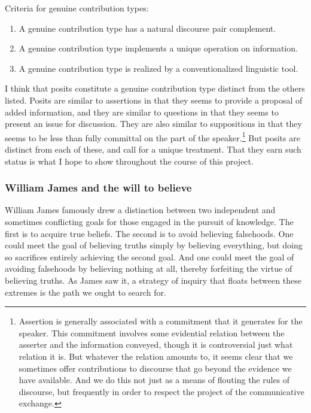 \documentclass[letterpaper,]{article}
\begin{document}
Criteria for genuine contribution types:

\begin{enumerate}
\def\labelenumi{\arabic{enumi}.}
\itemsep1pt\parskip0pt
\item
  A genuine contribution type has a natural discourse pair complement.
\item
  A genuine contribution type implements a unique operation on
  information.
\item
  A genuine contribution type is realized by a conventionalized
  linguistic tool.
\end{enumerate}

I think that posits constitute a genuine contribution type distinct from
the others listed. Posits are similar to assertions in that they seems
to provide a proposal of added information, and they are similar to
questions in that they seems to present an issue for discussion. They
are also similar to suppositions in that they seems to be less than
fully committal on the part of the speaker.\footnote{Assertion is
  generally associated with a commitment that it generates for the
  speaker. This commitment involves some evidential relation between the
  asserter and the information conveyed, though it is controversial just
  what relation it is. But whatever the relation amounts to, it seems
  clear that we sometimes offer contributions to discourse that go
  beyond the evidence we have available. And we do this not just as a
  means of flouting the rules of discourse, but frequently in order to
  respect the project of the communicative exchange.} But posits are
distinct from each of these, and call for a unique treatment. That they
earn such status is what I hope to show throughout the course of this
project.


\subsubsection{William James and the will to believe}\label{james}

William James famously drew a distinction between two independent and
sometimes conflicting goals for those engaged in the pursuit of
knowledge. The first is to acquire true beliefs. The second is to avoid
believing falsehoods. One could meet the goal of believing truths simply
by believing everything, but doing so sacrifices entirely achieving the
second goal. And one could meet the goal of avoiding falsehoods by
believing nothing at all, thereby forfeiting the virtue of believing
truths. As James saw it, a strategy of inquiry that floats between these
extremes is the path we ought to search for.
\end{document}

